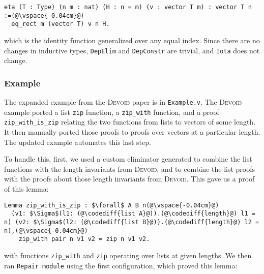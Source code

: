\begin{lstlisting}[backgroundcolor=\color{cyan!30}]
eta (T : Type) (n m : nat) (H : n = m) (v : vector T m) : vector T n :=(@\vspace{-0.04cm}@)
  eq_rect m (vector T) v n H.
\end{lstlisting}
which is the identity function generalized over any equal index.
Since there are no changes in inductive types, \lstinline{DepElim} and \lstinline{DepConstr} are trivial,
and \lstinline{Iota} does not change.


\subsubsection{Example}

The expanded example from the \textsc{Devoid} paper is in \lstinline{Example.v}.
The \textsc{Devoid} example ported a list \lstinline{zip} function,
a \lstinline{zip_with} function, and a proof \lstinline{zip_with_is_zip} relating the two
functions from lists to vectors of some length.
It then manually ported those proofs to proofs over vectors at a particular length.
The updated \toolname example automates this last step.

To handle this, first, we used a custom eliminator \toolname generated to combine the list functions
with the length invariants from \textsc{Devoid}, and to combine the list proofs
with the proofs about those length invariants from \textsc{Devoid}.
This gave us a proof of this lemma:

\begin{lstlisting}
Lemma zip_with_is_zip : $\forall$ A B n(@\vspace{-0.04cm}@)
  (v1: $\Sigma$(l1: (@\codediff{list A}@)).(@\codediff{length}@) l1 = n) (v2: $\Sigma$(l2: (@\codediff{list B}@)).(@\codediff{length}@) l2 = n),(@\vspace{-0.04cm}@)
    zip_with pair n v1 v2 = zip n v1 v2.
\end{lstlisting}
with functions \lstinline{zip_with} and \lstinline{zip} operating over lists at given lengths.
We then ran \lstinline{Repair module} using the first
configuration, which proved this lemma:

